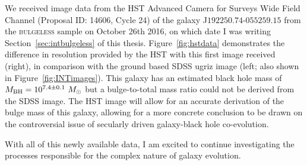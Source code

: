 We received image data from the HST Advanced Camera for Surveys Wide Field Channel (Proposal ID: 14606, Cycle 24) of the galaxy J$192250.74$-$055259.15$ from the \textsc{bulgeless} sample on October 26th 2016, on which date I was writing Section~\ref{sec:intbulgeless} of this thesis. Figure~\ref{fig:hstdata} demonstrates the difference in resolution provided by the HST with this first image received (right), in comparison with the ground based SDSS ugriz image (left; also shown in Figure~\ref{fig:INTimages}). This galaxy has an estimated black hole mass of $M_{\rm{BH}} = 10^{7.4\pm0.1}~M_{\odot}$ but a bulge-to-total mass ratio could not be derived from the SDSS image. The HST image will allow for an accurate derivation of the bulge mass of this galaxy, allowing for a more concrete conclusion to be drawn on the controversial issue of secularly driven galaxy-black hole co-evolution. 

With all of this newly available data, I am excited to continue investigating the processes responsible for the complex nature of galaxy evolution. 

